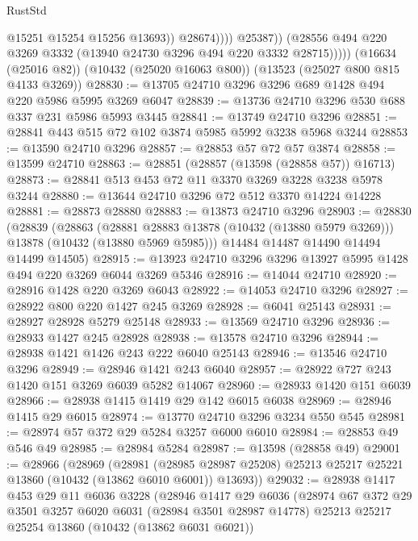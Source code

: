 \begin{lexlean}{RustStd}
\begin{coremodule}
                          @15251
                          @15254
                          @15256
                          @13693))
                      @28674))))
              @25387))
          (@28556 @494 @220 @3269 @3332 (@13940 @24730 @3296 @494 @220 @3332 @28715)))))
    (@16634 (@25016 @82))
    (@10432 (@25020 @16063 @800))
    (@13523 (@25027 @800 @815 @4133 @3269))
@28830 := @13705 @24710 @3296 @3296 @689 @1428 @494 @220 @5986 @5995 @3269 @6047
@28839 := @13736 @24710 @3296 @530 @688 @337 @231 @5986 @5993 @3445
@28841 := @13749 @24710 @3296
@28851 := @28841 @443 @515 @72 @102 @3874 @5985 @5992 @3238 @5968 @3244
@28853 := @13590 @24710 @3296
@28857 := @28853 @57 @72 @57 @3874
@28858 := @13599 @24710
@28863 := @28851 (@28857 (@13598 (@28858 @57)) @16713)
@28873 := @28841 @513 @453 @72 @11 @3370 @3269 @3228 @3238 @5978 @3244
@28880 := @13644 @24710 @3296 @72 @512 @3370 @14224 @14228
@28881 := @28873 @28880
@28883 := @13873 @24710 @3296
@28903 := @28830
    (@28839
      (@28863
        (@28881 @28883 @13878 (@10432 (@13880 @5979 @3269)))
        @13878
        (@10432 (@13880 @5969 @5985)))
      @14484
      @14487
      @14490
      @14494
      @14499
      @14505)
@28915 := @13923 @24710 @3296 @3296 @13927 @5995 @1428 @494 @220 @3269 @6044 @3269 @5346
@28916 := @14044 @24710
@28920 := @28916 @1428 @220 @3269 @6043
@28922 := @14053 @24710 @3296
@28927 := @28922 @800 @220 @1427 @245 @3269
@28928 := @6041 @25143
@28931 := @28927 @28928 @5279 @25148
@28933 := @13569 @24710 @3296
@28936 := @28933 @1427 @245 @28928
@28938 := @13578 @24710 @3296
@28944 := @28938 @1421 @1426 @243 @222 @6040 @25143
@28946 := @13546 @24710 @3296
@28949 := @28946 @1421 @243 @6040
@28957 := @28922 @727 @243 @1420 @151 @3269 @6039 @5282 @14067
@28960 := @28933 @1420 @151 @6039
@28966 := @28938 @1415 @1419 @29 @142 @6015 @6038
@28969 := @28946 @1415 @29 @6015
@28974 := @13770 @24710 @3296 @3234 @550 @545
@28981 := @28974 @57 @372 @29 @5284 @3257 @6000 @6010
@28984 := @28853 @49 @546 @49
@28985 := @28984 @5284
@28987 := @13598 (@28858 @49)
@29001 := @28966
    (@28969
      (@28981
        (@28985 @28987 @25208)
        @25213
        @25217
        @25221
        @13860
        (@10432 (@13862 @6010 @6001))
        @13693))
@29032 := @28938
    @1417
    @453
    @29
    @11
    @6036
    @3228
    (@28946
      @1417
      @29
      @6036
      (@28974
        @67
        @372
        @29
        @3501
        @3257
        @6020
        @6031
        (@28984 @3501 @28987 @14778)
        @25213
        @25217
        @25254
        @13860
        (@10432 (@13862 @6031 @6021))

\end{coremodule}
\end{lexlean}
